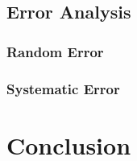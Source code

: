 \documentclass[12pt]{report}
\begin{document}
	\begin{table}[h]
		\centering
		\begin{tabular}{|c|c|}
			\hline
			 
		\end{tabular}
	\end{table}


	\begin{table}[h]
		\centering
		\begin{tabular}{|c|c|c|c|}
			\hline
			 
		\end{tabular}
	\end{table}


	\begin{table}[h]
		\centering
		\begin{tabular}{|c|c|c|}
			\hline
			 
		\end{tabular}
	\end{table}


\section{Error Analysis} %
\label{sec:Error Analysis}

\subsection{Random Error}
\label{subsec:RandomError}


\subsection{Systematic Error}
\label{subsec: Systematic Error}



\chapter{Conclusion}
\label{ch:Conclusion}



\end{document}
